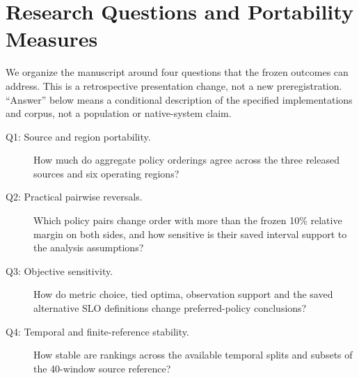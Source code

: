 \section{Research Questions and Portability Measures}\label{sec:study-design}\label{sec:rq}
We organize the manuscript around four questions that the frozen outcomes
can address. This is a retrospective presentation change, not a new
preregistration. ``Answer'' below means a conditional description of the
specified implementations and corpus, not a population or native-system
claim.
\begin{description}
\item[Q1: Source and region portability.] How much do aggregate policy
orderings agree across the three released sources and six operating regions?
\item[Q2: Practical pairwise reversals.] Which policy pairs change order
with more than the frozen 10\% relative margin on both sides, and how
sensitive is their saved interval support to the analysis assumptions?
\item[Q3: Objective sensitivity.] How do metric choice, tied optima,
observation support and the saved alternative SLO definitions change
preferred-policy conclusions?
\item[Q4: Temporal and finite-reference stability.] How stable are
rankings across the available temporal splits and subsets of the
40-window source reference?
\end{description}

